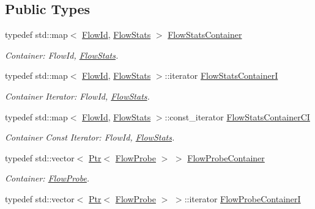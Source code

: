 \subsection*{Public Types}
\begin{DoxyCompactItemize}
\item 
typedef std\+::map$<$ \hyperlink{group__flow-monitor_ga39a766c4a370cdb9ab8ac85da4b288e9}{Flow\+Id}, \hyperlink{structns3_1_1FlowMonitor_1_1FlowStats}{Flow\+Stats} $>$ \hyperlink{classns3_1_1FlowMonitor_a6dc86073dee117ed141b8871990c074f}{Flow\+Stats\+Container}
\begin{DoxyCompactList}\small\item\em Container\+: Flow\+Id, \hyperlink{structns3_1_1FlowMonitor_1_1FlowStats}{Flow\+Stats}. \end{DoxyCompactList}\item 
typedef std\+::map$<$ \hyperlink{group__flow-monitor_ga39a766c4a370cdb9ab8ac85da4b288e9}{Flow\+Id}, \hyperlink{structns3_1_1FlowMonitor_1_1FlowStats}{Flow\+Stats} $>$\+::iterator \hyperlink{classns3_1_1FlowMonitor_aa8c4d865ea35a641dd7de3c23f0eac0d}{Flow\+Stats\+ContainerI}
\begin{DoxyCompactList}\small\item\em Container Iterator\+: Flow\+Id, \hyperlink{structns3_1_1FlowMonitor_1_1FlowStats}{Flow\+Stats}. \end{DoxyCompactList}\item 
typedef std\+::map$<$ \hyperlink{group__flow-monitor_ga39a766c4a370cdb9ab8ac85da4b288e9}{Flow\+Id}, \hyperlink{structns3_1_1FlowMonitor_1_1FlowStats}{Flow\+Stats} $>$\+::const\+\_\+iterator \hyperlink{classns3_1_1FlowMonitor_a877e8f8629ab3d39b7c320c8900de46a}{Flow\+Stats\+Container\+CI}
\begin{DoxyCompactList}\small\item\em Container Const Iterator\+: Flow\+Id, \hyperlink{structns3_1_1FlowMonitor_1_1FlowStats}{Flow\+Stats}. \end{DoxyCompactList}\item 
typedef std\+::vector$<$ \hyperlink{classns3_1_1Ptr}{Ptr}$<$ \hyperlink{classns3_1_1FlowProbe}{Flow\+Probe} $>$ $>$ \hyperlink{classns3_1_1FlowMonitor_a35214d6743fdb20acd43eff946b2050d}{Flow\+Probe\+Container}
\begin{DoxyCompactList}\small\item\em Container\+: \hyperlink{classns3_1_1FlowProbe}{Flow\+Probe}. \end{DoxyCompactList}\item 
typedef std\+::vector$<$ \hyperlink{classns3_1_1Ptr}{Ptr}$<$ \hyperlink{classns3_1_1FlowProbe}{Flow\+Probe} $>$ $>$\+::iterator \hyperlink{classns3_1_1FlowMonitor_ae3836bab362fd4a699288a142aa8146a}{Flow\+Probe\+ContainerI}

\end{DoxyCompactItemize}
